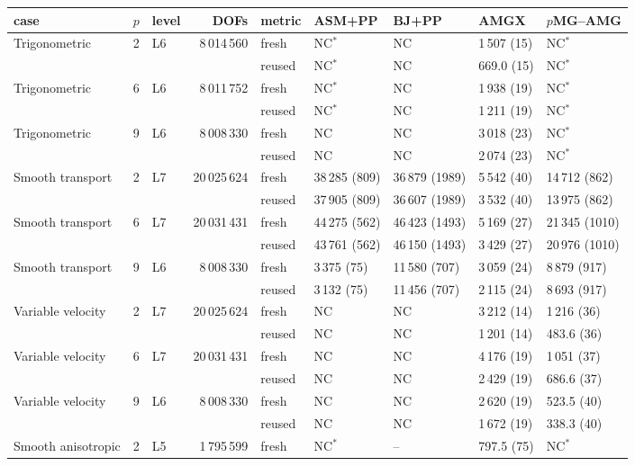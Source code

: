 \begin{tabular}{lrlrlllll}
\toprule
case & $p$ & level & DOFs & metric & ASM+PP & BJ+PP & AMGX & $p$MG--AMG \\
\midrule
Trigonometric & 2 & L6 & 8\,014\,560 & fresh & NC$^*$ & NC & 1\,507 (15) & NC$^*$\\
 & & &  & reused & NC$^*$ & NC & 669.0 (15) & NC$^*$\\
\addlinespace[2pt]
Trigonometric & 6 & L6 & 8\,011\,752 & fresh & NC$^*$ & NC & 1\,938 (19) & NC$^*$\\
 & & &  & reused & NC$^*$ & NC & 1\,211 (19) & NC$^*$\\
\addlinespace[2pt]
Trigonometric & 9 & L6 & 8\,008\,330 & fresh & NC & NC & 3\,018 (23) & NC$^*$\\
 & & &  & reused & NC & NC & 2\,074 (23) & NC$^*$\\
\addlinespace[2pt]
Smooth transport & 2 & L7 & 20\,025\,624 & fresh & 38\,285 (809) & 36\,879 (1989) & 5\,542 (40) & 14\,712 (862)\\
 & & &  & reused & 37\,905 (809) & 36\,607 (1989) & 3\,532 (40) & 13\,975 (862)\\
\addlinespace[2pt]
Smooth transport & 6 & L7 & 20\,031\,431 & fresh & 44\,275 (562) & 46\,423 (1493) & 5\,169 (27) & 21\,345 (1010)\\
 & & &  & reused & 43\,761 (562) & 46\,150 (1493) & 3\,429 (27) & 20\,976 (1010)\\
\addlinespace[2pt]
Smooth transport & 9 & L6 & 8\,008\,330 & fresh & 3\,375 (75) & 11\,580 (707) & 3\,059 (24) & 8\,879 (917)\\
 & & &  & reused & 3\,132 (75) & 11\,456 (707) & 2\,115 (24) & 8\,693 (917)\\
\addlinespace[2pt]
Variable velocity & 2 & L7 & 20\,025\,624 & fresh & NC & NC & 3\,212 (14) & 1\,216 (36)\\
 & & &  & reused & NC & NC & 1\,201 (14) & 483.6 (36)\\
\addlinespace[2pt]
Variable velocity & 6 & L7 & 20\,031\,431 & fresh & NC & NC & 4\,176 (19) & 1\,051 (37)\\
 & & &  & reused & NC & NC & 2\,429 (19) & 686.6 (37)\\
\addlinespace[2pt]
Variable velocity & 9 & L6 & 8\,008\,330 & fresh & NC & NC & 2\,620 (19) & 523.5 (40)\\
 & & &  & reused & NC & NC & 1\,672 (19) & 338.3 (40)\\
\addlinespace[2pt]
Smooth anisotropic & 2 & L5 & 1\,795\,599 & fresh & NC$^*$ & -- & 797.5 (75) & NC$^*$\\

\end{tabular}

